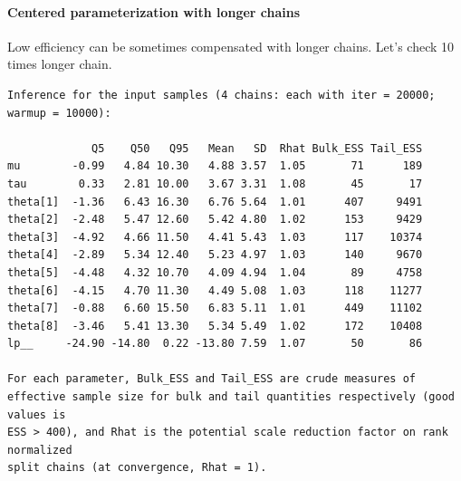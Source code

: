 \documentclass[american,]{article}
\let\oldparagraph\paragraph
\renewcommand{\paragraph}[1]{\oldparagraph{#1}\mbox{}}
\begin{document}
\hypertarget{centered-parameterization-with-longer-chains}{%
\paragraph{Centered parameterization with longer
chains}\label{centered-parameterization-with-longer-chains}}

Low efficiency can be sometimes compensated with longer chains. Let's
check 10 times longer chain.

\begin{verbatim}
Inference for the input samples (4 chains: each with iter = 20000; warmup = 10000):

             Q5    Q50   Q95   Mean   SD  Rhat Bulk_ESS Tail_ESS
mu        -0.99   4.84 10.30   4.88 3.57  1.05       71      189
tau        0.33   2.81 10.00   3.67 3.31  1.08       45       17
theta[1]  -1.36   6.43 16.30   6.76 5.64  1.01      407     9491
theta[2]  -2.48   5.47 12.60   5.42 4.80  1.02      153     9429
theta[3]  -4.92   4.66 11.50   4.41 5.43  1.03      117    10374
theta[4]  -2.89   5.34 12.40   5.23 4.97  1.03      140     9670
theta[5]  -4.48   4.32 10.70   4.09 4.94  1.04       89     4758
theta[6]  -4.15   4.70 11.30   4.49 5.08  1.03      118    11277
theta[7]  -0.88   6.60 15.50   6.83 5.11  1.01      449    11102
theta[8]  -3.46   5.41 13.30   5.34 5.49  1.02      172    10408
lp__     -24.90 -14.80  0.22 -13.80 7.59  1.07       50       86

For each parameter, Bulk_ESS and Tail_ESS are crude measures of 
effective sample size for bulk and tail quantities respectively (good values is 
ESS > 400), and Rhat is the potential scale reduction factor on rank normalized
split chains (at convergence, Rhat = 1).
\end{verbatim}
\end{document}
